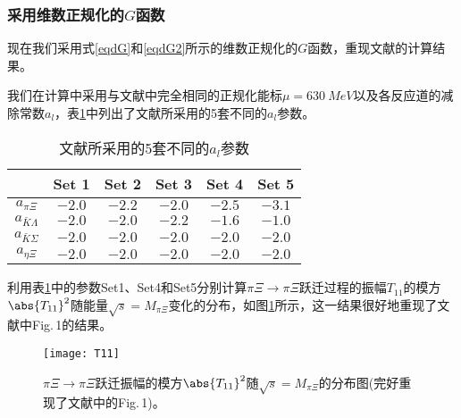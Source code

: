 \subsubsection{采用维数正规化的$G$函数}
现在我们采用式\eqref{eqdG}和\eqref{eqdG2}所示的维数正规化的$G$函数，重现文献\cite{PhysRevLett.89.252001}的计算结果。\par
我们在计算中采用与文献\cite{PhysRevLett.89.252001}中完全相同的正规化能标$\mu=\SI{630}{MeV}$以及各反应道的减除常数$a_{l}$，表\ref{tabal}中列出了文献\cite{PhysRevLett.89.252001}所采用的5套不同的$a_{l}$参数。
\begin{table}[b]
\centering
\caption[5套不同的$a_{l}$参数]{文献\cite{PhysRevLett.89.252001}所采用的5套不同的$a_{l}$参数}
\label{tabal}
\begin{spacing}{1.5}
\setlength{\tabcolsep}{8mm}
\begin{tabular}{cccccc}
	\toprule
	\hline
	~ & Set 1& Set 2& Set 3 & Set 4& Set 5\\\midrule
	$a_{\pi\Xi}$ & $-2.0$ & $-2.2$& $-2.0$&$-2.5$&$-3.1$ \\
	$a_{\bar{K}\Lambda}$ & $-2.0$& $-2.0$ & $-2.2$ &$-1.6$&$-1.0$ \\
	$a_{\bar{K}\Sigma}$ & $-2.0$& $-2.0$ & $-2.0$ & $-2.0$ &$-2.0$ \\
	$a_{\eta\Xi}$ & $-2.0$& $-2.0$& $-2.0$& $-2.0$& $-2.0$ \\
	\bottomrule
\end{tabular}
\end{spacing}
\end{table}
利用表\ref{tabal}中的参数Set1、Set4和Set5分别计算$\pi\Xi\to\pi\Xi$跃迁过程的振幅$T_{11}$的模方$\abs{T_{11}}^2$随能量$\sqrt{s}=M_{\pi\Xi}$变化的分布，如图\ref{T11}所示，这一结果很好地重现了文献\cite{PhysRevLett.89.252001}中Fig.\,1的结果。
\begin{figure}[t]
	\centering
	\texttt{[image: T11]}
	\caption[$\pi\Xi\to\pi\Xi$跃迁振幅的模方]{$\pi\Xi\to\pi\Xi$跃迁振幅的模方$\abs{T_{11}}^2$随$\sqrt{s}=M_{\pi\Xi}$的分布图(完好重现了文献\cite{PhysRevLett.89.252001}中的Fig.\,1)。}
	\label{T11}
\end{figure}

